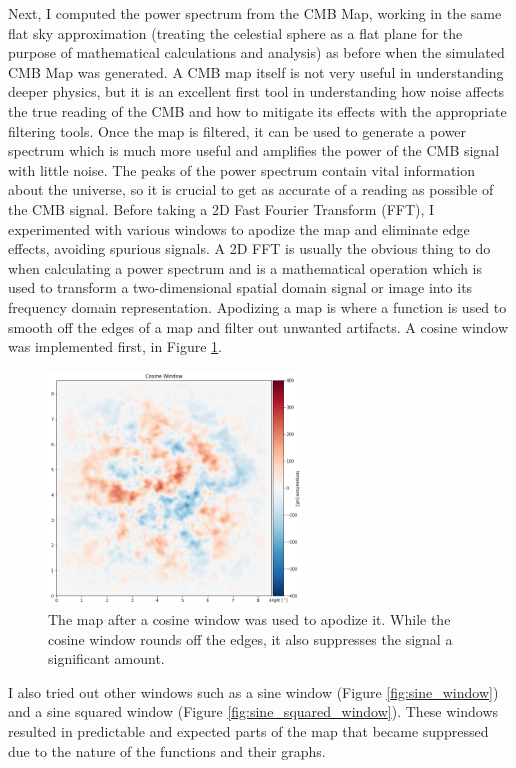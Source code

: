 \documentclass[12pt]{article}
\begin{document}
Next, I computed the power spectrum from the CMB Map, working in the same flat sky approximation (treating the celestial sphere as a flat plane for the purpose of mathematical calculations and analysis) as before when the simulated CMB Map was generated. A CMB map itself is not very useful in understanding deeper physics, but it is an excellent first tool in understanding how noise affects the true reading of the CMB and how to mitigate its effects with the appropriate filtering tools. Once the map is filtered, it can be used to generate a power spectrum which is much more useful and amplifies the power of the CMB signal with little noise. The peaks of the power spectrum contain vital information about the universe, so it is crucial to get as accurate of a reading as possible of the CMB signal. Before taking a 2D Fast Fourier Transform (FFT), I experimented with various windows to apodize the map and eliminate edge effects, avoiding spurious signals. A 2D FFT is usually the obvious thing to do when calculating a power spectrum and is a mathematical operation which is used to transform a two-dimensional spatial domain signal or image into its frequency domain representation. Apodizing a map is where a function is used to smooth off the edges of a map and filter out unwanted artifacts. A cosine window was implemented first, in Figure \ref{fig:cosine_window}.

\begin{figure}[H]
    \centering
    \includegraphics[width=0.6\textwidth]{images/cosine.png}
    \caption{The map after a cosine window was used to apodize it. While the cosine window rounds off the edges, it also suppresses the signal a significant amount.}
    \label{fig:cosine_window}
\end{figure}

I also tried out other windows such as a sine window (Figure \ref{fig:sine_window}) and a sine squared window (Figure \ref{fig:sine_squared_window}). These windows resulted in predictable and expected parts of the map that became suppressed due to the nature of the functions and their graphs.
\end{document}
